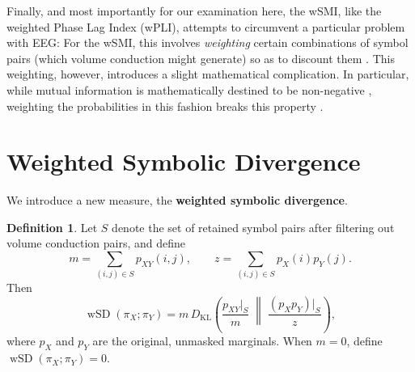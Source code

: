 \documentclass[journal]{IEEEtran}
\theoremstyle{definition}
\newtheorem{definition}[proposition]{Definition}
\newif\ifreview
\newcommand{\added}[1]{\begingroup\ifreview\color{addition}\fi#1\endgroup}
\newcommand{\removed}[1]{\ifreview{\color{deletion}#1}\space\fi}
\begin{document}
Finally, and most importantly for our examination here, the wSMI, like the weighted Phase Lag Index (wPLI), attempts to circumvent a particular problem with EEG: \removed{the instantaneous conduction of signal, not necessarily representative of actual brain activity or connectivity \texttt{[original citation: nobody]}.} For the wSMI, this involves \textit{weighting} certain combinations of symbol pairs (which volume conduction might generate) so as to discount them \cite{king2013information, imperatori2019eeg}. This weighting, however, introduces a slight mathematical complication. In particular, while mutual information is mathematically destined to be non-negative \cite{shannon1948mathematical}, weighting the probabilities in this fashion breaks this property \cite{imperatori2019eeg, kvaalseth1991relative}.

\section{Weighted Symbolic Divergence}

We introduce a new measure, the \textbf{weighted symbolic divergence}.

\begin{definition}
Let $S$ denote the set of retained symbol pairs after filtering out volume conduction pairs, and define
\[
m = \sum_{(i,j)\in S} p_{XY}(i,j),
\qquad
z = \sum_{(i,j)\in S} p_X(i)p_Y(j).
\]
Then
\[
\operatorname{wSD}(\pi_X;\pi_Y)
=
m\,D_{\mathrm{KL}}\!\left(
\frac{p_{XY}|_S}{m}
\;\middle\|\;
\frac{(p_Xp_Y)|_S}{z}
\right),
\]
where $p_X$ and $p_Y$ are the original, unmasked marginals.
When $m=0$, define $\operatorname{wSD}(\pi_X;\pi_Y)=0$.
\end{definition}

\added{}
\end{document}
